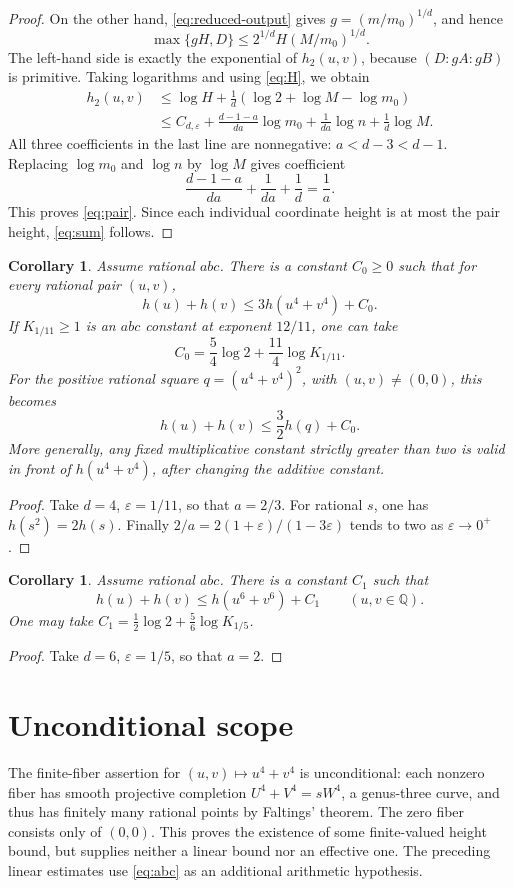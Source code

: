 \documentclass[11pt,a4paper]{article}
\newtheorem{corollary}[theorem]{Corollary}
\newcommand{\Q}{\mathbb Q}
\begin{document}
\begin{proof}
On the other hand, \eqref{eq:reduced-output} gives
$g=(m/m_0)^{1/d}$, and hence
\[
 \max\{gH,D\}\le2^{1/d}H(M/m_0)^{1/d}.
\]
The left-hand side is exactly the exponential of $h_2(u,v)$,
because $(D:gA:gB)$ is primitive. Taking logarithms and using
\eqref{eq:H}, we obtain
\begin{align*}
 h_2(u,v)
 &\le \log H+\frac1d(\log2+\log M-\log m_0)\\
 &\le C_{d,\varepsilon}
   +\frac{d-1-a}{da}\log m_0
   +\frac1{da}\log n+\frac1d\log M.
\end{align*}
All three coefficients in the last line are nonnegative:
$a<d-3<d-1$. Replacing $\log m_0$ and $\log n$ by
$\log M$ gives coefficient
\[
            \frac{d-1-a}{da}+\frac1{da}+\frac1d=\frac1a.
\]
This proves \eqref{eq:pair}. Since each individual coordinate
height is at most the pair height, \eqref{eq:sum} follows.
\end{proof}

\begin{corollary}\label{cor:quartic-three}
Assume rational $abc$. There is a constant $C_0\ge0$ such that
for every rational pair $(u,v)$,
\[
                   h(u)+h(v)\le3h(u^4+v^4)+C_0.
\]
If $K_{1/11}\ge1$ is an $abc$ constant at exponent $12/11$,
one can take
\[
            C_0=\frac54\log2+\frac{11}4\log K_{1/11}.
\]
For the positive rational square
$q=(u^4+v^4)^2$, with $(u,v)\ne(0,0)$, this becomes
\[
                         h(u)+h(v)\le\frac32h(q)+C_0.
\]
More generally, any fixed multiplicative constant strictly greater
than two is valid in front of $h(u^4+v^4)$, after changing the
additive constant.
\end{corollary}
\begin{proof}
Take $d=4$, $\varepsilon=1/11$, so that $a=2/3$.
For rational $s$, one has $h(s^2)=2h(s)$.
Finally $2/a=2(1+\varepsilon)/(1-3\varepsilon)$ tends to
two as $\varepsilon\to0^+$.
\end{proof}

\begin{corollary}
Assume rational $abc$. There is a constant $C_1$ such that
\[
                   h(u)+h(v)\le h(u^6+v^6)+C_1
                     \qquad(u,v\in\Q).
\]
One may take $C_1=\tfrac12\log2+
\tfrac56\log K_{1/5}$.
\end{corollary}
\begin{proof}
Take $d=6$, $\varepsilon=1/5$, so that $a=2$.
\end{proof}

\section{Unconditional scope}
The finite-fiber assertion for $(u,v)\mapsto u^4+v^4$ is
unconditional: each nonzero fiber has smooth projective completion
$U^4+V^4=sW^4$, a genus-three curve, and thus has finitely many
rational points by Faltings' theorem. The zero fiber consists only
of $(0,0)$. This proves the existence of some finite-valued height
bound, but supplies neither a linear bound nor an effective one.
The preceding linear estimates use \eqref{eq:abc} as an additional
arithmetic hypothesis.
\end{document}
